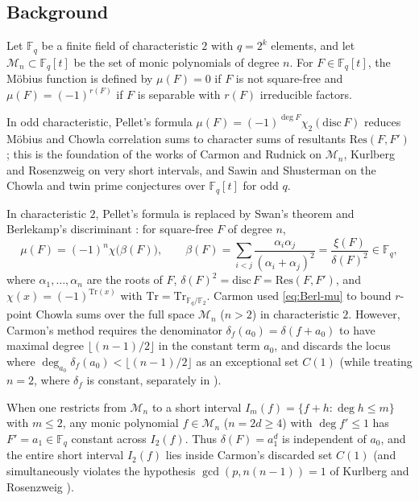 \documentclass[11pt,a4paper]{amsart}
\theoremstyle{remark}
\numberwithin{equation}{section}
\newcommand{\Fq}{\mathbb{F}_q}
\newcommand{\Ftwo}{\mathbb{F}_2}
\newcommand{\Tr}{\mathrm{Tr}}
\newcommand{\Me}{\mathcal{M}}
\begin{document}
\subsection{Background}
Let $\Fq$ be a finite field of characteristic $2$ with $q=2^k$ elements, and let $\Me_n\subset\Fq[t]$ be the set of
monic polynomials of degree $n$. For $F\in\Fq[t]$, the M\"obius function is defined by $\mu(F)=0$ if $F$ is not
square-free and $\mu(F)=(-1)^{r(F)}$ if $F$ is separable with $r(F)$ irreducible factors.

In odd characteristic, Pellet's formula $\mu(F)=(-1)^{\deg F}\chi_2(\mathrm{disc}\,F)$ reduces M\"obius and Chowla
correlation sums to character sums of resultants $\mathrm{Res}(F,F')$; this is the foundation of the works of Carmon and
Rudnick \cite{CaRu} on $\Me_n$, Kurlberg and Rosenzweig \cite{KR} on very short intervals, and Sawin and Shusterman
\cite{SS} on the Chowla and twin prime conjectures over $\Fq[t]$ for odd $q$.

In characteristic $2$, Pellet's formula is replaced by Swan's theorem \cite{Swan} and Berlekamp's discriminant
\cite{Berl}: for square-free $F$ of degree $n$,
\begin{equation}\label{eq:Berl-mu}
\mu(F)=(-1)^n\chi\bigl(\beta(F)\bigr),\qquad
\beta(F)=\sum_{i<j}\frac{\alpha_i\alpha_j}{(\alpha_i+\alpha_j)^2}=\frac{\xi(F)}{\delta(F)^2}\in\Fq,
\end{equation}
where $\alpha_1,\dots,\alpha_n$ are the roots of $F$, $\delta(F)^2=\mathrm{disc}\,F=\mathrm{Res}(F,F')$, and
$\chi(x)=(-1)^{\Tr(x)}$ with $\Tr=\Tr_{\Fq/\Ftwo}$. Carmon \cite{Carmon} used \eqref{eq:Berl-mu} to bound $r$-point
Chowla sums over the full space $\Me_n$ ($n>2$) in characteristic $2$. However, Carmon's method requires the denominator
$\delta_f(a_0)=\delta(f+a_0)$ to have maximal degree $\lfloor(n-1)/2\rfloor$ in the constant term $a_0$, and discards
the locus where $\deg_{a_0}\delta_f(a_0)<\lfloor(n-1)/2\rfloor$ as an exceptional set $C(1)$ \cite[(3.11)]{Carmon}
(while treating $n=2$, where $\delta_f$ is constant, separately in \cite[Proposition~5.1]{Carmon}).

When one restricts from $\Me_n$ to a short interval $I_m(f)=\{f+h:\deg h\le m\}$ with $m\le 2$, any monic polynomial
$f\in\Me_n$ ($n=2d\ge 4$) with $\deg f'\le 1$ has $F'=a_1\in\Fq$ constant across $I_2(f)$. Thus
$\delta(F)=a_1^d$ is independent of $a_0$, and the entire short interval $I_2(f)$ lies inside Carmon's discarded set
$C(1)$ (and simultaneously violates the hypothesis $\gcd(p,n(n-1))=1$ of Kurlberg and Rosenzweig \cite[Theorem~13]{KR}).
\end{document}
